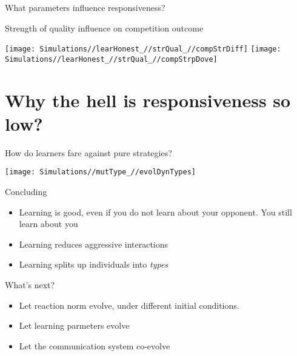 \documentclass[
  ignorenonframetext,
]{beamer}
\providecommand{\tightlist}{%
  \setlength{\itemsep}{0pt}\setlength{\parskip}{0pt}}
\begin{document}
\begin{frame}{What parameters influence responsiveness?}
\protect\hypertarget{what-parameters-influence-responsiveness-3}{}

\begin{block}{Strength of quality influence on competition outcome}

\texttt{[image: Simulations//learHonest\_//strQual\_//compStrDiff]}
\texttt{[image: Simulations//learHonest\_//strQual\_//compStrpDove]}

\end{block}

\end{frame}

\hypertarget{why-the-hell-is-responsiveness-so-low}{%
\section{Why the hell is responsiveness so
low?}\label{why-the-hell-is-responsiveness-so-low}}

\begin{frame}{How do learners fare against pure strategies?}
\protect\hypertarget{how-do-learners-fare-against-pure-strategies}{}

\begin{center}\texttt{[image: Simulations//mutType\_//evolDynTypes]} \end{center}

\end{frame}

\begin{frame}{Concluding}
\protect\hypertarget{concluding}{}

\begin{itemize}
\tightlist
\item
  Learning is good, even if you do not learn about your opponent. You
  still learn about you
\item
  Learning reduces aggressive interactions
\item
  Learning splits up individuals into \emph{types}
\end{itemize}

\end{frame}

\begin{frame}{What's next?}
\protect\hypertarget{whats-next}{}

\begin{itemize}
\tightlist
\item
  Let reaction norm evolve, under different initial conditions.
\item
  Let learning parmeters evolve
\item
  Let the communication system co-evolve
\end{itemize}

\end{frame}
\end{document}

